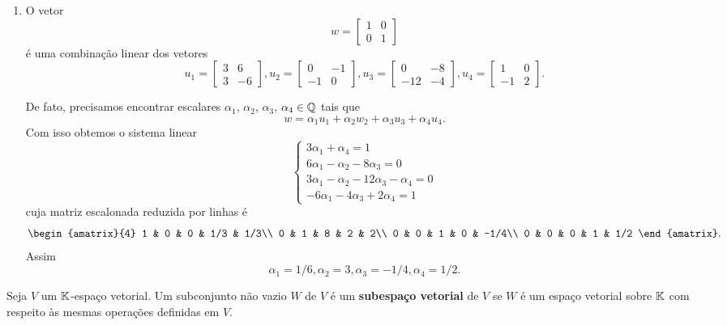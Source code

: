 \begin{exemplo}
\begin{enumerate}[label={\arabic*})]
		    \item O vetor
		    	\[
		    		w = \begin{bmatrix}
		    			1 & 0\\
		    			0 & 1
		    		\end{bmatrix}
		    	\]
		    	é uma combinação linear dos vetores
		    	\[
		    		u_1 = \begin{bmatrix}3 & 6\\3 & -6\end{bmatrix},
		    		u_2 = \begin{bmatrix}0 & -1\\-1 & 0\end{bmatrix},
		    		u_3 = \begin{bmatrix}0 & -8\\-12 & -4\end{bmatrix},
		    		u_4 = \begin{bmatrix}1 & 0\\-1 & 2\end{bmatrix}.
		    	\]
		    	\begin{solucao}
		    		De fato, precisamos encontrar escalares $\alpha_1$, $\alpha_2$, $\alpha_3$, $\alpha_4 \in \mathbb{Q}$ tais que
		    		\[ w = \alpha_1 u_1 + \alpha_2 w_2 + \alpha_3 u_3 + \alpha_4 u_4.\]
		    		Com isso obtemos o sistema linear
		    		\[
		    			\begin{cases}
		    				3\alpha_1 + \alpha_4 = 1\\
		    				6\alpha_1 - \alpha_2 - 8\alpha_3 = 0\\
		    				3\alpha_1 - \alpha_2 - 12 \alpha_3 - \alpha_4 = 0\\
		    				-6\alpha_1 - 4\alpha_3 + 2\alpha_4 = 1
		    			\end{cases}
		    		\]
		    		cuja matriz escalonada reduzida por linhas é
		    		\[
		    			\begin{amatrix}{4}
		    				1 & 0 & 0 & 1/3 & 1/3\\
		    				0 & 1 & 8 & 2 & 2\\
		    				0 & 0 & 1 & 0 & -1/4\\
		    				0 & 0 & 0 & 1 & 1/2
		    			\end{amatrix}.
		    		\]
		    		Assim
		    		\[\alpha_1 = 1/6, \alpha_2 = 3, \alpha_3 = -1/4, \alpha_4 = 1/2.\]
		    	\end{solucao}
	\end{enumerate}
\end{exemplo}

\begin{definicao}
	Seja $V$ um $\mathbb{K}$-espa\c{c}o vetorial. Um subconjunto n\~ao vazio $W$ de $V$ \'e um \textbf{subespa\c{c}o vetorial} de $V$ se $W$ é um espaço vetorial
	sobre $\mathbb{K}$ com respeito às mesmas operações definidas em $V$.
\end{definicao}

